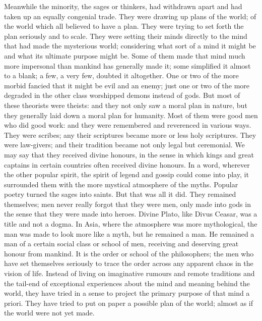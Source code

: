 Meanwhile the minority, the sages or thinkers, had withdrawn apart and had taken up an equally congenial trade. They were drawing up plans of the world; of the world which all believed to have a plan. They were trying to set forth the plan seriously and to scale. They were setting their minds directly to the mind that had made the mysterious world; considering what sort of a mind it might be and what its ultimate purpose might be. Some of them made that mind much more impersonal than mankind has generally made it; some simplified it almost to a blank; a few, a very few, doubted it altogether. One or two of the more morbid fancied that it might be evil and an enemy; just one or two of the more degraded in the other class worshipped demons instead of gods. But most of these theorists were theists: and they not only saw a moral plan in nature, but they generally laid down a moral plan for humanity. Most of them were good men who did good work: and they were remembered and reverenced in various ways. They were scribes; any their scriptures became more or less holy scriptures. They were law-givers; and their tradition became not only legal but ceremonial. We may say that they received divine honours, in the sense in which kings and great captains in certain countries often received divine honours. In a word, wherever the other popular spirit, the spirit of legend and gossip could come into play, it surrounded them with the more mystical atmosphere of the myths. Popular poetry turned the sages into saints. But that was all it did. They remained themselves; men never really forgot that they were men, only made into gods in the sense that they were made into heroes. Divine Plato, like Divus Ceasar, was a title and not a dogma. In Asia, where the atmosphere was more mythological, the man was made to look more like a myth, but he remained a man. He remained a man of a certain social class or school of men, receiving and deserving great honour from mankind. It is the order or school of the philosophers; the men who have set themselves seriously to trace the order across any apparent chaos in the vision of life. Instead of living on imaginative rumours and remote traditions and the tail-end of exceptional experiences about the mind and meaning behind the world, they have tried in a sense to project the primary purpose of that mind a priori. They have tried to put on paper a possible plan of the world; almost as if the world were not yet made.

